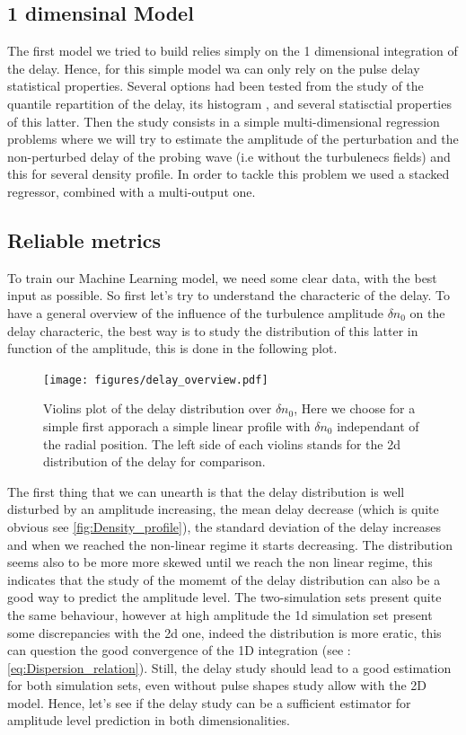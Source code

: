 \documentclass[11pt,a4paper,openany]{report}
\begin{document}
\begin{multicols}{2}
    \chapter{1 dimensinal Model}
    The first model we tried to build relies simply on the 1 dimensional integration of the delay.
    Hence, for this simple model wa can only rely on the pulse delay statistical properties. Several options had been tested from the study of the quantile repartition of the delay, its histogram , and several statisctial properties of this latter. Then the study consists in a simple multi-dimensional regression problems where we will try to estimate the amplitude of the perturbation and the non-perturbed delay of the probing wave (i.e without the turbulenecs fields) and this for several density profile. In order to tackle this problem we used a stacked regressor, combined with a multi-output one.
    \section{Reliable metrics}

    To train our Machine Learning model, we need some clear data, with the best input as possible. So first let's try to understand the characteric of the delay. To have a general overview of the influence of the turbulence amplitude $\delta n_0$ on the delay characteric, the best way is to study the distribution of this latter in function of the amplitude, this is done in the following plot.

    \begin{figure}[H]
        \centering
        \texttt{[image: figures/delay\_overview.pdf]}
        \caption{Violins plot of the delay distribution over $\delta n_0$, Here we choose for a simple first apporach a simple linear profile with $\delta n_0$ independant of the radial position. The left side of each violins stands for the 2d distribution of the delay for comparison.}
        \label{fig:Violins_delay}
    \end{figure}
    The first thing that we can unearth is that the delay distribution is well disturbed by an amplitude increasing, the mean delay decrease (which is quite obvious see \ref{fig:Density_profile}), the standard deviation of the delay increases and when we reached the non-linear regime it starts decreasing. The distribution seems also to be more more skewed until we reach the non linear regime, this indicates that the study of the momemt of the delay distribution can also be a good way to predict the amplitude level. The two-simulation sets present quite the same behaviour, however at high amplitude the 1d simulation set present some discrepancies with the 2d one, indeed the distribution is more eratic, this can question the good convergence of the 1D integration (see : \ref{eq:Dispersion_relation}). Still, the delay study should lead to a good estimation for both simulation sets, even without pulse shapes study allow with the 2D model.
    Hence, let's see if the delay study can be a sufficient estimator for amplitude level prediction in both dimensionalities.


\end{multicols}
\end{document}
